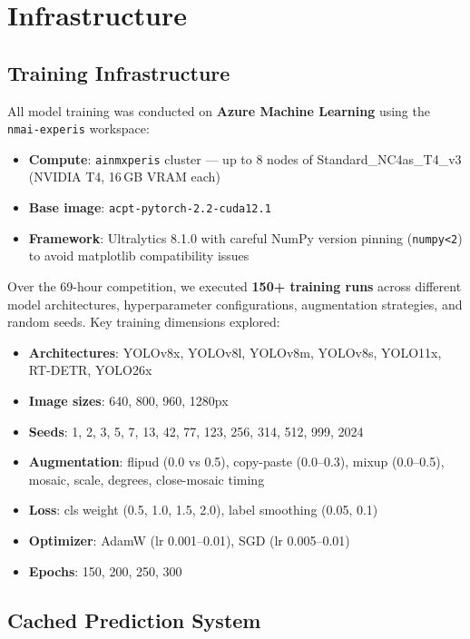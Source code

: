 \documentclass[11pt,a4paper]{article}
\begin{document}
\section{Infrastructure}
\label{sec:infra}

\subsection{Training Infrastructure}

All model training was conducted on \textbf{Azure Machine Learning} using the \texttt{nmai-experis} workspace:
\begin{itemize}    \item \textbf{Compute}: \texttt{ainmxperis} cluster --- up to 8 nodes of Standard\_NC4as\_T4\_v3 (NVIDIA T4, 16\,GB VRAM each)
    \item \textbf{Base image}: \texttt{acpt-pytorch-2.2-cuda12.1}
    \item \textbf{Framework}: Ultralytics 8.1.0 with careful NumPy version pinning (\texttt{numpy<2}) to avoid matplotlib compatibility issues
\end{itemize}

Over the 69-hour competition, we executed \textbf{150+ training runs} across different model architectures, hyperparameter configurations, augmentation strategies, and random seeds. Key training dimensions explored:

\begin{itemize}
\item \textbf{Architectures}: YOLOv8x, YOLOv8l, YOLOv8m, YOLOv8s, YOLO11x, RT-DETR, YOLO26x
\item \textbf{Image sizes}: 640, 800, 960, 1280px
\item \textbf{Seeds}: 1, 2, 3, 5, 7, 13, 42, 77, 123, 256, 314, 512, 999, 2024
\item \textbf{Augmentation}: flipud (0.0 vs 0.5), copy-paste (0.0--0.3), mixup (0.0--0.5), mosaic, scale, degrees, close-mosaic timing
\item \textbf{Loss}: cls weight (0.5, 1.0, 1.5, 2.0), label smoothing (0.05, 0.1)
\item \textbf{Optimizer}: AdamW (lr 0.001--0.01), SGD (lr 0.005--0.01)
\item \textbf{Epochs}: 150, 200, 250, 300
\end{itemize}

\subsection{Cached Prediction System}
\end{document}
